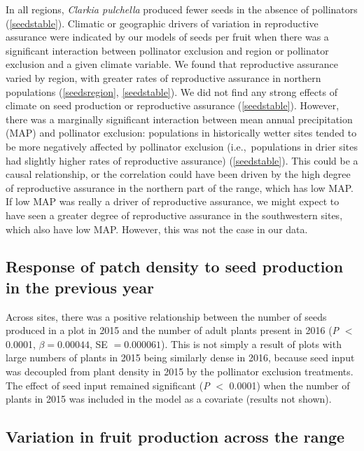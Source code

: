 \documentclass{article}
\begin{document}
In all regions, \textit{Clarkia pulchella} produced fewer seeds in the absence of pollinators (\autoref{seedstable}). Climatic or geographic drivers of variation in reproductive assurance were indicated by our models of seeds per fruit when there was a significant interaction between pollinator exclusion and region or pollinator exclusion and a given climate variable. We found that reproductive assurance varied by region, with greater rates of reproductive assurance in northern populations (\autoref{seedsregion}, \autoref{seedstable}). We did not find any strong effects of climate on seed production or reproductive assurance (\autoref{seedstable}). However, there was a marginally significant interaction between mean annual precipitation (MAP) and pollinator exclusion: populations in historically wetter sites tended to be more negatively affected by pollinator exclusion (i.e.,\ populations in drier sites had slightly higher rates of reproductive assurance) (\autoref{seedstable}). This could be a causal relationship, or the correlation could have been driven by the high degree of reproductive assurance in the northern part of the range, which has low MAP. If low MAP was really a driver of reproductive assurance, we might expect to have seen a greater degree of reproductive assurance in the southwestern sites, which also have low MAP. However, this was not the case in our data. 

\subsection*{Response of patch density to seed production in the previous year}

Across sites, there was a positive relationship between the number of seeds produced in a plot in 2015 and the number of adult plants present in 2016 (\textit{P} $<$ 0.0001, $\beta = 0.00044$, SE $=0.000061$). This is not simply a result of plots with large numbers of plants in 2015 being similarly dense in 2016, because seed input was decoupled from plant density in 2015 by the pollinator exclusion treatments. The effect of seed input remained significant (\textit{P} $<$ 0.0001) when the number of plants in 2015 was included in the model as a covariate (results not shown). 

\subsection*{Variation in fruit production across the range}
\end{document}
